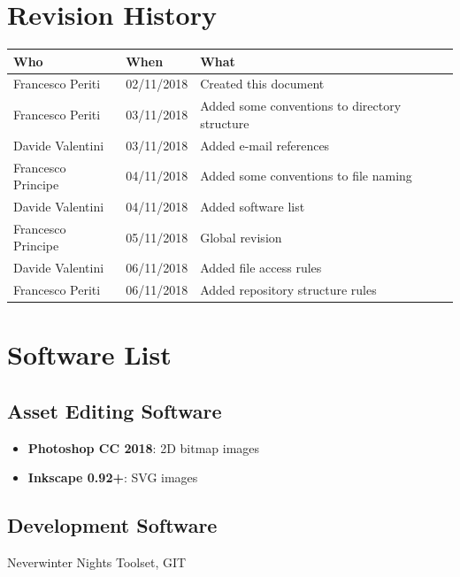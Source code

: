\documentclass[12pt]{article}
\begin{document}
\clearpage

\section*{Revision History}
\begin{table}[H]
\centering
\begin{tabular}{|l|l|l|}
\hline
\cellcolor{lightgray}\textbf{Who} & \cellcolor{lightgray}\textbf{When} & \cellcolor{lightgray}\textbf{What} \\ \hline
Francesco Periti & 02/11/2018 & Created this document \\ \hline
Francesco Periti & 03/11/2018 & Added some conventions to directory structure \\ \hline
Davide Valentini & 03/11/2018 & Added e-mail references \\ \hline
Francesco Principe & 04/11/2018 & Added some conventions to file naming \\ \hline
Davide Valentini & 04/11/2018 & Added software list \\ \hline
Francesco Principe & 05/11/2018 & Global revision \\ \hline
Davide Valentini & 06/11/2018 & Added file access rules \\ \hline
Francesco Periti & 06/11/2018 & Added repository structure rules \\ \hline
\end{tabular}
\end{table}

\clearpage

\section{Software List}

\subsection{Asset Editing Software}
\begin{itemize}
	\item \textbf{Photoshop CC 2018}: 2D bitmap images
	\item \textbf{Inkscape 0.92+}: SVG images
\end{itemize}

\subsection{Development Software}
Neverwinter Nights Toolset, GIT
\end{document}
